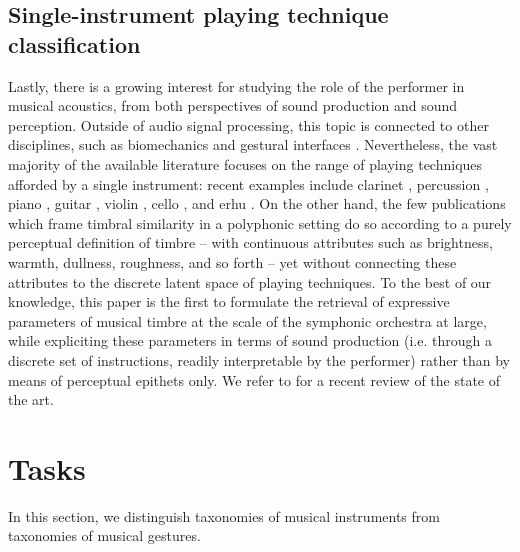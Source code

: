 \documentclass{article}
\makeatletter
\newcommand*{\ie}{i.e.\@\xspace}
\makeatother
\begin{document}
\subsection{Single-instrument playing technique classification}
Lastly, there is a growing interest for studying the role of the performer in musical acoustics, from both perspectives of sound production and sound perception.
Outside of audio signal processing, this topic is connected to other disciplines, such as biomechanics and gestural interfaces \cite{metcalf2014frontiers}.
Nevertheless, the vast majority of the available literature focuses on the range of playing techniques afforded by a single instrument: recent examples include clarinet \cite{loureiro2004ismir}, percussion \cite{tindale2004ismir}, piano \cite{bernays2013smc}, guitar \cite{foulon2013cmmr,su2014ismir,chen2015ismir}, violin \cite{young2008nime}, cello \cite[chapter 6]{chudy2016phd}, and erhu \cite{yang2014fma}.
On the other hand, the few publications which frame timbral similarity in a polyphonic setting do so according to a purely perceptual definition of timbre -- with continuous attributes such as brightness, warmth, dullness, roughness, and so forth \cite{antoine2018isma} -- yet without connecting these attributes to the discrete latent space of playing techniques.
To the best of our knowledge, this paper is the first to formulate the retrieval of expressive parameters of musical timbre at the scale of the symphonic orchestra at large, while expliciting these parameters in terms of sound production (\ie{} through a discrete set of instructions, readily interpretable by the performer) rather than by means of perceptual epithets only.
We refer to \cite{leman2017chapter} for a recent review of the state of the art.


\section{Tasks}
In this section, we distinguish taxonomies of musical instruments from taxonomies of musical gestures.
\end{document}
